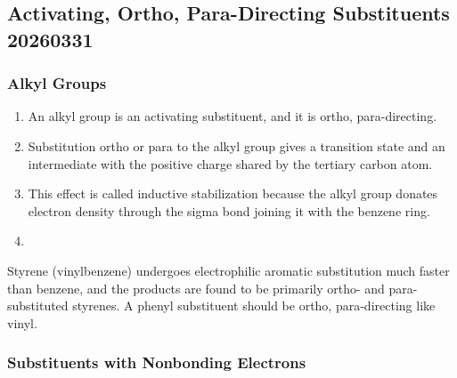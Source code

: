 \subsection{Activating, Ortho, Para-Directing Substituents 20260331}

\subsubsection{Alkyl Groups}

\begin{enumerate}
    \item An alkyl group is an activating substituent, and it is ortho, para-directing.
    \item Substitution ortho or para to the alkyl group gives a transition state and an intermediate with the positive charge shared by the tertiary carbon atom.
    \item This effect is called inductive stabilization because the alkyl group donates electron density through the sigma bond joining it with the benzene ring.
    \item
\end{enumerate}

\begin{example} %
    Styrene (vinylbenzene) undergoes electrophilic aromatic substitution much faster than benzene, and the products are found to be primarily ortho- and para-substituted styrenes. A phenyl substituent should be ortho, para-directing like vinyl.
\end{example}

\subsubsection{Substituents with Nonbonding Electrons}


